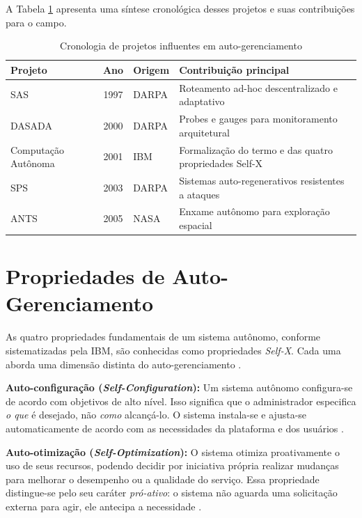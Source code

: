A Tabela \ref{tab:cronologia} apresenta uma síntese cronológica desses projetos e suas contribuições para o campo.

\begin{table}[H]
\caption{Cronologia de projetos influentes em auto-gerenciamento}
\label{tab:cronologia}
\centering
\begin{tabular}{lclp{7cm}}
\toprule
\textbf{Projeto} & \textbf{Ano} & \textbf{Origem} & \textbf{Contribuição principal} \\
\midrule
SAS   & 1997 & DARPA & Roteamento ad-hoc descentralizado e adaptativo \\
DASADA & 2000 & DARPA & Probes e gauges para monitoramento arquitetural \\
Computação Autônoma & 2001 & IBM & Formalização do termo e das quatro propriedades Self-X \\
SPS   & 2003 & DARPA & Sistemas auto-regenerativos resistentes a ataques \\
ANTS  & 2005 & NASA  & Enxame autônomo para exploração espacial \\
\bottomrule
\end{tabular}
\end{table}

\section{Propriedades de Auto-Gerenciamento}
\label{sec:propriedades}

As quatro propriedades fundamentais de um sistema autônomo, conforme sistematizadas pela IBM, são conhecidas como propriedades \textit{Self-X}. Cada uma aborda uma dimensão distinta do auto-gerenciamento \cite{kephart2003, W1999392360}.

\textbf{Auto-configuração (\textit{Self-Configuration}):} Um sistema autônomo configura-se de acordo com objetivos de alto nível. Isso significa que o administrador especifica \textit{o que} é desejado, não \textit{como} alcançá-lo. O sistema instala-se e ajusta-se automaticamente de acordo com as necessidades da plataforma e dos usuários \cite{W1999392360}.

\textbf{Auto-otimização (\textit{Self-Optimization}):} O sistema otimiza proativamente o uso de seus recursos, podendo decidir por iniciativa própria realizar mudanças para melhorar o desempenho ou a qualidade do serviço. Essa propriedade distingue-se pelo seu caráter \textit{pró-ativo}: o sistema não aguarda uma solicitação externa para agir, ele antecipa a necessidade \cite{W1999392360}.

